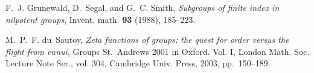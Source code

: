 \documentclass[12pt]{article}
\begin{document}
\begin{thebibliography}{99}

F.~J. Grunewald, D.~Segal, and G.~C. Smith, \emph{Subgroups of finite index in
  nilpotent groups}, Invent. math. \textbf{93} (1988), 185--223.

M.~P.~F. du~Sautoy, \emph{Zeta functions of groups: the quest for order versus the flight
  from ennui}, Groups St.\ Andrews 2001 in Oxford. Vol. I, London Math. Soc.
  Lecture Note Ser., vol. 304, Cambridge Univ. Press, 2003, pp.~150--189.

\end{thebibliography}
\end{document}
